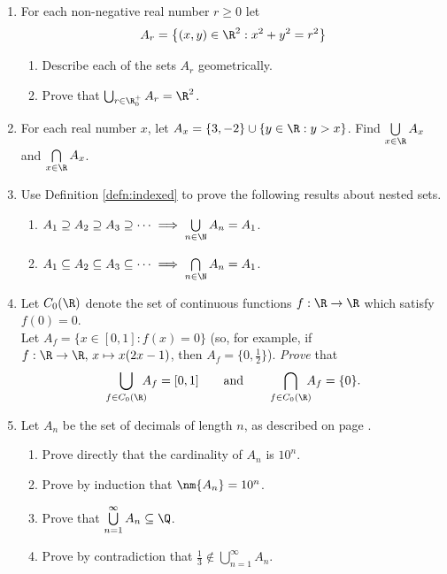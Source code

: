 \begin{enumerate}
  \item For each non-negative real number $r\ge 0$ let 
  \[A_r=\big\{(x,y)\in\R^2:x^2+y^2=r^2\big\}\]
		\begin{enumerate}
  		\item Describe each of the sets $A_r$ geometrically.
  		\item Prove that $\bigcup_{r\in\R^+_0}A_r=\R^2$.
		\end{enumerate}

  \item For each real number $x$, let $A_x=\{3,-2\}\cup\{y\in\R:y>x\}$. Find $\bigcup\limits_{x\in\R}A_x$ and $\bigcap\limits_{x\in\R}A_x$.
  
  \item Use Definition \ref{defn:indexed} to prove the following results about nested sets.
		\begin{enumerate}
  		\item $A_1\supseteq A_2\supseteq A_3\supseteq\cdots\implies \bigcup\limits_{n\in\N}A_n=A_1$.
  		\item $A_1\subseteq A_2\subseteq A_3\subseteq\cdots\implies \bigcap\limits_{n\in\N}A_n=A_1$.
		\end{enumerate}

  \item Let $C_0(\R)$ denote the set of continuous functions $f:\R\to\R$ which satisfy $f(0)=0$.\\
  Let $A_f=\{x\in[0,1]:f(x)=0\}$ (so, for example, if $f:\R\to\R,\,x \mapsto x(2x-1)$, then $A_f=\{0,\frac 12\}$).
    \emph{Prove} that
  \[\bigcup\limits_{f\in C_0(\R)}\negthickspace\negthickspace A_f=[0,1]\qquad\text{and}\qquad\bigcap\limits_{f\in C_0(\R)}\negthickspace\negthickspace A_f=\{0\}.\]
		
	\item Let $A_n$ be the set of decimals of length $n$, as described on page \pageref{ex:finitedec}.
		\begin{enumerate}
	  	\item Prove directly that the cardinality of $A_n$ is $10^n$.
	  	\item Prove by induction that $\nm{A_n}=10^n$.
	  	\item Prove that $\bigcup\limits_{n=1}^\infty A_n\subseteq\Q$.
			\item Prove by contradiction that $\frac 13\not\in\bigcup\limits_{n=1}^\infty A_n$.
		\end{enumerate}


\end{enumerate}
